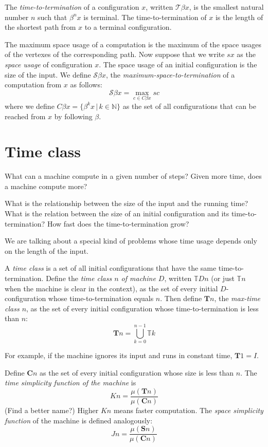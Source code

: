 \documentclass[10pt,statementpaper]{memoir}
\theoremstyle{definition}
\newcommand\TC{\mathcal{T}}
\newcommand\Teq{\mathbb{T}}
\newcommand\Teqsum{\mathbf{T}}
\newcommand\SC{\mathcal{S}}
\begin{document}
The \emph{time-to-termination} of a configuration $x$,
written $\TC \beta x$,
is the smallest natural number $n$ such that $\beta^n x$ is terminal.
The time-to-termination of $x$ is the length of the shortest path from $x$ to a terminal configuration.

The maximum space usage of a computation is
the maximum of the space usages of the vertexes of the corresponding path.
Now suppose that we write $s x$ as the \emph{space usage} of configuration $x$.
The space usage of an initial configuration is the size of the input.
We define $\SC \beta x$,
the \emph{maximum-space-to-termination} of a computation from $x$
as follows:
\begin{equation}
    \SC \beta x = \max_{c \in C \beta x} s c
\end{equation}
where we define
$C \beta x = \{ \beta^k x \,|\, k \in \mathbb N \}$
as the set of all configurations
that can be reached from $x$ by following $\beta$.

\section{Time class}

What can a machine compute in a given number of steps?
Given more time, does a machine compute more?

What is the relationship between the size of the input and the running time?
What is the relation between the size of
an initial configuration and its time-to-termination?
How fast does the time-to-termination grow?

We are talking about a special kind of problems
whose time usage depends only on the length of the input.

A \emph{time class} is a set of all initial configurations that have the same time-to-termination.
Define the \emph{time class $n$ of machine $D$},
written $\Teq D n$ (or just $\Teq n$ when the machine is clear in the context),
as the set of every initial $D$-configuration
whose time-to-termination equals $n$.
Then define $\Teqsum n$, the \emph{max-time class $n$},
as the set of every initial configuration whose time-to-termination is less than $n$:
\begin{equation}
    \Teqsum n = \bigcup_{k = 0}^{n - 1} \Teq k
\end{equation}

For example, if the machine ignores its input and runs in constant time,
$\Teqsum 1 = I$.

\newcommand{\Cset}{\mathbf{C}}
Define $\Cset n$ as the set of every initial configuration whose size is less than $n$.
The \emph{time simplicity function of the machine} is
\begin{equation}
    K n = \frac{\mu(\Teqsum n)}{\mu(\Cset n)}
\end{equation}
(Find a better name?)
Higher $K n$ means faster computation.
The \emph{space simplicity function} of the machine is defined analogously:
\begin{equation}
    J n = \frac{\mu(\mathbf S n)}{\mu(\Cset n)}
\end{equation}
\end{document}

